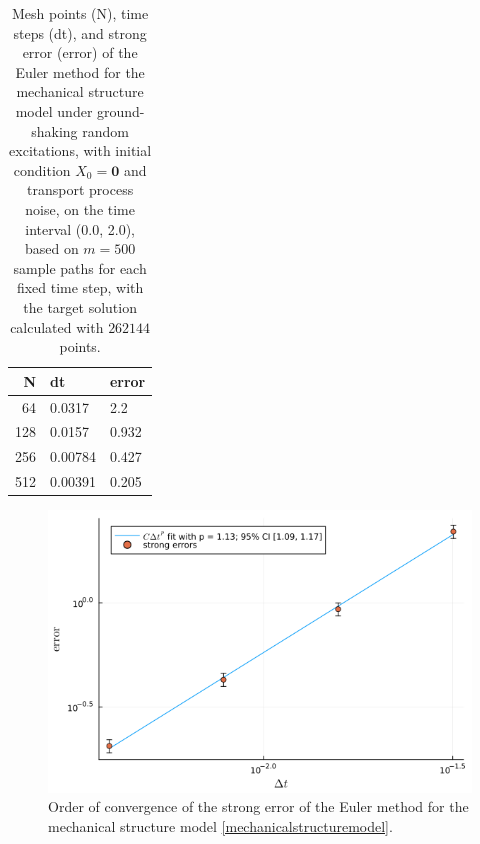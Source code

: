 \documentclass[reqno,12pt]{amsart}
\theoremstyle{plain} %
\theoremstyle{definition} %
\begin{document}
\begin{table}
    \begin{tabular}[htb]{|r|l|l|}
        \hline N & dt & error\\
        \hline \hline
        64 & 0.0317 & 2.2 \\
        128 & 0.0157 & 0.932 \\
        256 & 0.00784 & 0.427 \\
        512 & 0.00391 & 0.205 \\
        \hline
    \end{tabular}
    \bigskip

    \caption{Mesh points (N), time steps (dt), and strong error (error) of the Euler method for the mechanical structure model under ground-shaking random excitations, with initial condition $X_0 = \mathbf{0}$ and transport process noise, on the time interval (0.0, 2.0), based on $m = 500$ sample paths for each fixed time step, with the target solution calculated with $262144$ points.}
    \label{tableearthquake}
\end{table}

\begin{figure}[htb]
    \includegraphics[scale=0.6]{img/convergence_earthquake.png}
    \caption{Order of convergence of the strong error of the Euler method for the mechanical structure model \eqref{mechanicalstructuremodel}.}
    \label{figearthquake}
\end{figure}
\end{document}
